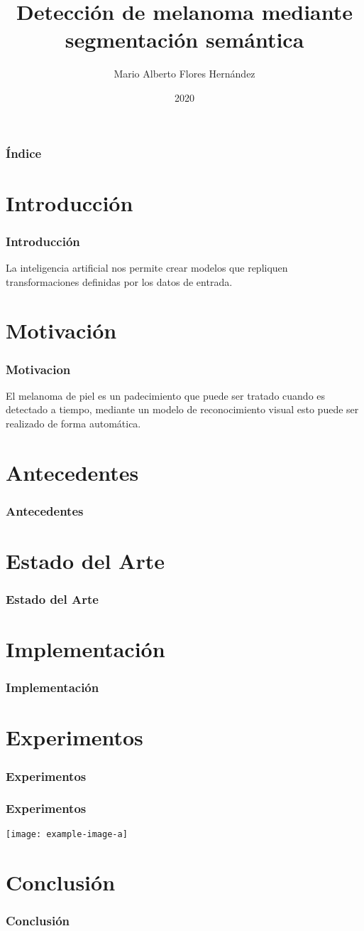 \documentclass{beamer}
\title{Detección de melanoma mediante segmentación semántica}
\author{Mario Alberto Flores Hernández}
\institute{FIME - UANL}
\date{2020}
\begin{document}
\frame{\titlepage}

\begin{frame}
    \frametitle{Índice}
        \tableofcontents
\end{frame}
\section{Introducción}
\begin{frame}
    \frametitle{Introducción}
    La inteligencia artificial nos permite crear modelos que repliquen transformaciones definidas por los datos de entrada.
\end{frame}

\section{Motivación}
\begin{frame}
    \frametitle{Motivacion}
    El melanoma de piel es un padecimiento que puede ser tratado cuando es detectado a tiempo, mediante un modelo de reconocimiento visual esto puede ser realizado de forma automática.
\end{frame}

\section{Antecedentes}
\begin{frame}
    \frametitle{Antecedentes}
    \blindtext[1]
\end{frame}

\section{Estado del Arte}
\begin{frame}
    \frametitle{Estado del Arte}
    \blindtext[1]
\end{frame}

\section{Implementación}
\begin{frame}
    \frametitle{Implementación}
    \blindtext[1]
\end{frame}

\section{Experimentos}
\begin{frame}

    \frametitle{Experimentos}
    \blindtext[1]

\end{frame}

\begin{frame}
    \frametitle{Experimentos}
    \texttt{[image: example-image-a]}
\end{frame}

\section{Conclusión}
\begin{frame}
    \frametitle{Conclusión}
    \blindtext[1]
\end{frame}
\end{document}
